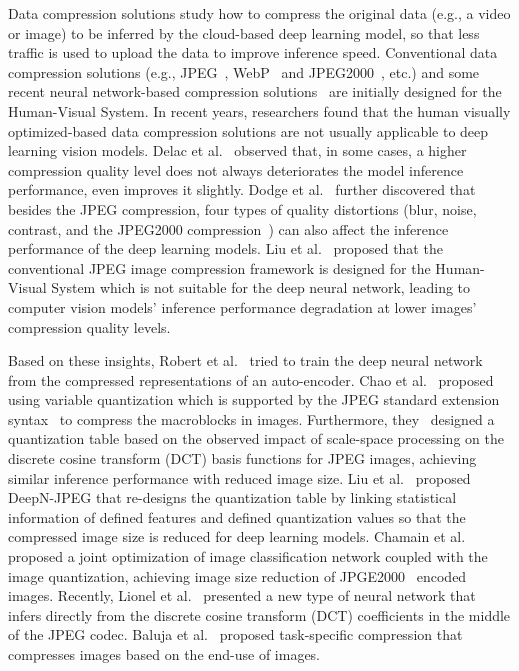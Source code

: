 Data compression solutions study how to compress the original data (e.g., a video or image) to be inferred by the cloud-based deep learning model, so that less traffic is used to upload the data to improve inference speed. Conventional data compression solutions (e.g., JPEG~\cite{jpeg}, WebP~\cite{calore2010meet} and JPEG2000~\cite{rabbani2002jpeg2000}, etc.) and some recent neural network-based compression solutions~\cite{toderici2017full, theis2017lossy, toderici2015variable, rippel2017real} are initially designed for the Human-Visual System. In recent years, researchers found that the human visually optimized-based data compression solutions are not usually applicable to deep learning vision models. Delac et al.~\cite{delac2005effects} observed that, in some cases, a higher compression quality level does not always deteriorates the model inference performance, even improves it slightly. Dodge et al.~\cite{dodge2016understanding} further discovered that besides the JPEG compression, four types of quality distortions (blur, noise, contrast, and the JPEG2000 compression~\cite{rabbani2002jpeg2000}) can also affect the inference performance of the deep learning models. Liu et al.~\cite{DeepN-JPEG} proposed that the conventional JPEG image compression framework is designed for the Human-Visual System which is not suitable for the deep neural network, leading to computer vision models' inference performance degradation at lower images' compression quality levels. %

Based on these insights, Robert et al.~\cite{torfason2018towards} tried to train the deep neural network from the compressed representations of an auto-encoder. Chao et al.~\cite{chao2011preserving} proposed using variable quantization which is supported by the JPEG standard extension syntax~\cite{dis199110918} to compress the macroblocks in images. Furthermore, they~\cite{chao2013design} designed a quantization table based on the observed impact of scale-space processing on the discrete cosine transform (DCT) basis functions for JPEG images, achieving similar inference performance with reduced image size. Liu et al.~\cite{DeepN-JPEG} proposed DeepN-JPEG that re-designs the quantization table by linking statistical information of defined features and defined quantization values so that the compressed image size is reduced for deep learning models. Chamain et al.~\cite{2019quannet} proposed a joint optimization of image classification network coupled with the image quantization, achieving image size reduction of JPGE2000~\cite{rabbani2002jpeg2000} encoded images. Recently, Lionel et al.~\cite{gueguen2018faster} presented a new type of neural network that infers directly from the discrete cosine transform (DCT) coefficients in the middle of the JPEG codec. Baluja et al.~\cite{baluja2019task} proposed task-specific compression that compresses images based on the end-use of images. %

